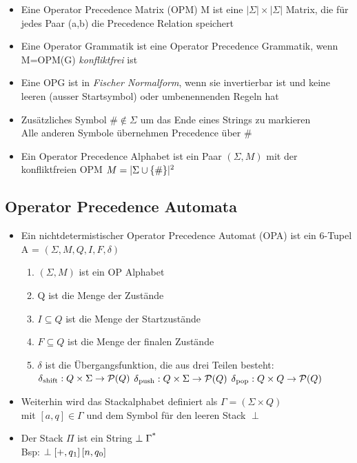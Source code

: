\documentclass[
10pt,
pantone315, 	%
]{beamer}
\begin{document}
\begin{frame}[t]{\subsecname}
	\begin{itemize}[<+->]
	\item Eine Operator Precedence Matrix (OPM) M ist eine $|\Sigma| \times |\Sigma |$ Matrix, die für jedes Paar (a,b) die Precedence Relation speichert
	
	\item 
	Eine Operator Grammatik ist eine Operator Precedence Grammatik, wenn M=OPM(G) \textit{konfliktfrei} ist
	\item
	Eine OPG ist in \textit{Fischer Normalform}, wenn sie invertierbar ist und keine leeren (ausser Startsymbol) oder umbenennenden Regeln hat
	\item
	Zusätzliches Symbol $\# \notin \Sigma$ um das Ende eines Strings zu markieren\\
	Alle anderen Symbole übernehmen Precedence über $\#$
	\item
	Ein Operator Precedence Alphabet ist ein Paar $(\Sigma, M)$ mit der konfliktfreien OPM $M = | \Sigma \cup \{ \# \} | \textsuperscript{2}$	
	\end{itemize}
\end{frame}

\subsection{Operator Precedence Automata}
\begin{frame}[t]{\subsecname}
	\begin{itemize}[<+->]
		\item
		Ein nichtdetermistischer Operator Precedence Automat (OPA) ist ein 6-Tupel A = $(\Sigma, M, Q, I, F, \delta)$
		\begin{enumerate}
			\item
			$(\Sigma, M)$ ist ein OP Alphabet
			\item
			Q ist die Menge der Zustände
			\item
			$ I \subseteq Q$ ist die Menge der Startzustände
			\item
			$ F \subseteq Q$ ist die Menge der finalen Zustände
			\item 
			$\delta$ ist die Übergangsfunktion, die aus drei Teilen besteht: \\
			$\delta \textsubscript{shift}: Q \times \Sigma \rightarrow \mathcal{P} (Q)$
			$\delta \textsubscript{push}: Q \times \Sigma \rightarrow \mathcal{P} (Q)$
			$\delta \textsubscript{pop}: Q \times Q \rightarrow \mathcal{P} (Q)$
		\end{enumerate}
		\item
		Weiterhin wird das Stackalphabet definiert als $\Gamma = (\Sigma \times Q)$\\
		mit $\left[a , q \right]\in \Gamma$ und dem Symbol für den leeren Stack ${\perp}$
		\item
		Der Stack $\Pi$ ist ein String $\perp \Gamma \textsuperscript{*}$ \\
		Bsp: $\perp \left[+, q \textsubscript{1} \right] \left[ n, q \textsubscript{0} \right]$
	\end{itemize}
\end{frame}
\end{document}
